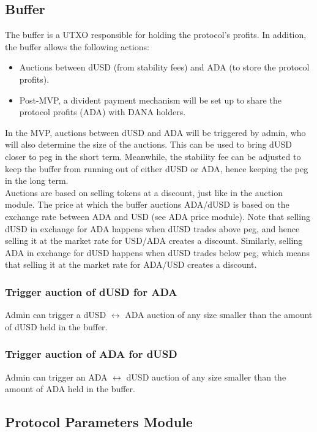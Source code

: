 \documentclass{article} %
\begin{document}
\subsection{Buffer}

The buffer is a UTXO responsible for holding the protocol's profits. In
addition, the buffer allows the following actions:
\begin{itemize}
  \item Auctions between dUSD (from stability fees) and ADA (to store the
    protocol profits).
  \item Post-MVP, a divident payment mechanism will be set up to share the
    protocol profits (ADA) with DANA holders.
\end{itemize}

In the MVP, auctions between dUSD and ADA will be triggered by admin, who will
also determine the size of the auctions. This can be used to bring dUSD closer
to peg in the short term. Meanwhile, the stability fee can be adjusted to keep
the buffer from running out of either dUSD or ADA, hence keeping the peg in the
long term. \\

Auctions are based on selling tokens at a discount, just like in the auction
module. The price at which the buffer auctions ADA/dUSD is based on the exchange
rate between ADA and USD (see ADA price module). Note that selling dUSD in
exchange for ADA happens when dUSD trades above peg, and hence selling it at the
market rate for USD/ADA creates a discount. Similarly, selling ADA in exchange
for dUSD happens when dUSD trades below peg, which means that selling it at the
market rate for ADA/USD creates a discount.

\subsubsection*{Trigger auction of dUSD for ADA}

Admin can trigger a dUSD $\leftrightarrow$ ADA auction of any size smaller than
the amount of dUSD held in the buffer.

\subsubsection*{Trigger auction of ADA for dUSD}

Admin can trigger an ADA $\leftrightarrow$ dUSD auction of any size smaller than
the amount of ADA held in the buffer.

\subsection{Protocol Parameters Module}
\end{document}
